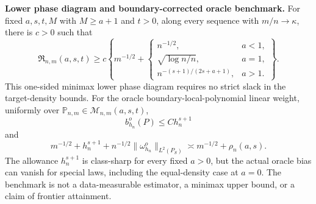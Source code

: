 \textbf{Lower phase diagram and boundary-corrected oracle benchmark.}
For fixed \(a,s,t,M\) with \(M\ge a+1\) and \(t>0\), along every sequence with \(m/n\to\kappa\), there is \(c>0\) such that
\[
\mathfrak R_{n,m}(a,s,t)\ge c\left\{m^{-1/2}+\begin{cases}
n^{-1/2},&a<1,\\
\sqrt{\log n/n},&a=1,\\
n^{-(s+1)/(2s+a+1)},&a>1.
\end{cases}\right\}.
\]
This one-sided minimax lower phase diagram requires no strict slack in the target-density bounds.  For the oracle boundary-local-polynomial linear weight, uniformly over \(\mathbb P_{n,m}\in\mathcal M_{n,m}(a,s,t)\),
\[
b_{h_n}^o(P)\le C h_n^{s+1}
\]
and
\[
m^{-1/2}+h_n^{s+1}
+n^{-1/2}\|\omega_{h_n}^o\|_{L^2(P_S)}
\asymp m^{-1/2}+\rho_n(a,s).
\]
The allowance \(h_n^{s+1}\) is class-sharp for every fixed \(a>0\), but the actual oracle bias can vanish for special laws, including the equal-density case at \(a=0\).  The benchmark is not a data-measurable estimator, a minimax upper bound, or a claim of frontier attainment.